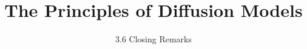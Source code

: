 ﻿%

\graphicspath{{../images/}}
\title{The Principles of Diffusion Models}
\subtitle{3.6 Closing Remarks}


\begin{frame}
    \titlepage
\end{frame}


